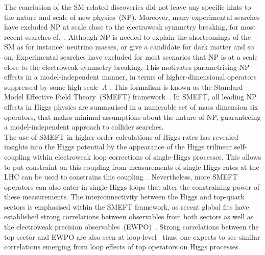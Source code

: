 The conclusion of the SM-related discoveries did not leave any specific hints to the nature and scale of new physics~(NP).  Moreover, many experimental searches have excluded NP at scale close to the electroweak symmetry breaking, for most recent searches cf.~\cite{ATLAS-CONF-2022-006,ATLAS-CONF-2022-011,ATLAS-CONF-2022-012,ATLAS-CONF-2022-010,ATLAS-CONF-2022-009,CMS-PAS-EXO-20-011,CMS-PAS-EXO-21-010,CMS-PAS-EXO-21-003,CMS-PAS-EXO-20-006,CMS-PAS-EXO-21-006,CMS:2022nty,CMS:2022yjm}. Although NP is needed to explain the shortcomings of the SM as for instance: neutrino masses, or give a candidate for dark matter and so on. Experimental searches have excluded for most scenarios that NP is at a scale close to the electroweak symmetry breaking.
This motivates parametrising NP effects in a model-independent manner, in terms of higher-dimensional operators suppressed by some high scale~$\Lambda$ . This formalism is known as the Standard Model Effective Field Theory~(SMEFT) framework~\cite{Giudice:2007fh,Grzadkowski:2010es,Contino:2013kra, Elias-Miro:2013eta,Gupta:2014rxa}. In SMEFT, all leading NP effects in Higgs physics are summarised in a numerable set of mass dimension six operators, that makes minimal assumptions about the nature of NP, guaranteeing a model-independent approach to collider searches.\\ 
%
The use of SMEFT in higher-order calculations of Higgs rates has revealed insights into the Higgs potential by the appearance of the Higgs trilinear self-coupling within electroweak loop corrections of single-Higgs processes. This allows to put constraint on this coupling from measurements of single-Higgs rates at the LHC can be used to constrains this coupling~\cite{McCullough:2013rea, Gorbahn:2016uoy, Degrassi:2016wml, Bizon:2016wgr, Maltoni:2017ims, Degrassi:2019yix, Degrassi:2021uik, Haisch:2021hvy}. Nevertheless, more SMEFT operators can also enter in single-Higgs loops that alter the constraining power of these measurements. The interconnectivity between the Higgs and top-quark sectors is  emphasised within the SMEFT framework, as recent global fits have established strong correlations between observables from both sectors as well as the electroweak precision observables~(EWPO)~\cite{Ellis:2020unq}. Strong correlations between the top sector and EWPO are also seen at loop-level~\cite{Dawson:2020oco,Dawson:2022bxd} thus; one expects to see similar correlations emerging from loop effects of top operators on Higgs processes. \\
